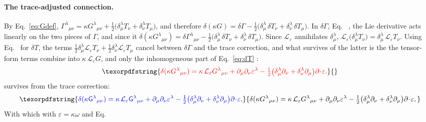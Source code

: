 \documentclass[prd,aps,preprint,superscriptaddress,nofootinbib,amsmath,amssymb,eqsecnum]{revtex4-2}
\providecommand{\DIFaddtex}[1]{{\protect\color{blue} \sf #1}} %
\providecommand{\DIFdeltex}[1]{{\protect\color{red} \scriptsize #1}} %
\providecommand{\DIFaddbegin}{} %
\providecommand{\DIFaddend}{} %
\providecommand{\DIFdelbegin}{} %
\providecommand{\DIFdelend}{} %
\providecommand{\DIFadd}[1]{\texorpdfstring{\DIFaddtex{#1}}{#1}} %
\providecommand{\DIFdel}[1]{\texorpdfstring{\DIFdeltex{#1}}{}} %
\begin{document}
\paragraph{\DIFdel{The trace-adjusted connection.}} %
\addtocounter{paragraph}{-1}%
\DIFdelend By Eq.~\eqref{eq:Gdef},
\DIFdelbegin \DIFdel{$\Gamma^{\lambda}{}_{\mu\nu}=\kappa G^{\lambda}{}_{\mu\nu}
+\tfrac12\big(\delta^\lambda_\mu T_\nu+\delta^\lambda_\nu T_\mu\big)$, and therefore
$\delta(\kappa G)=\delta\Gamma-\tfrac12\big(\delta^\lambda_\mu\,\delta T_\nu+\delta^\lambda_\nu\,\delta T_\mu\big)$. In $\delta\Gamma$, Eq.~}%
\DIFdel{, the Lie derivative acts linearly on the two pieces of
$\Gamma$, and since it }\DIFdelend \DIFaddbegin \DIFadd{$\delta(\kappa G^{\lambda}{}_{\mu\nu})=\delta\Gamma^{\lambda}{}_{\mu\nu}
-\tfrac12\big(\delta^\lambda_\mu\,\delta T_\nu+\delta^\lambda_\nu\,\delta T_\mu\big)$. Since
$\mathcal{L}_\varepsilon$ }\DIFaddend annihilates $\delta^\lambda_\mu$, \DIFdelbegin \DIFdel{$\mathcal{L}_\varepsilon\big(\delta^\lambda_\mu T_\nu\big)=\delta^\lambda_\mu\,\mathcal{L}_\varepsilon T_\nu$.
Using Eq.~}%
\DIFdel{for $\delta T$, the terms $\tfrac12\delta^\lambda_\mu\mathcal{L}_\varepsilon T_\nu
+\tfrac12\delta^\lambda_\nu\mathcal{L}_\varepsilon T_\mu$ cancel between $\delta\Gamma$ and
the trace correction, and what survives of the latter is the }\DIFdelend \DIFaddbegin \DIFadd{the tensor-form terms combine into
$\kappa\,\mathcal{L}_\varepsilon G$, and only the }\DIFaddend inhomogeneous part of Eq.~\eqref{eq:dT}
\DIFdelbegin \DIFdel{:
}\begin{displaymath}
\DIFdel{\delta(\kappa G^{\lambda}{}_{\mu\nu})=\kappa\,\mathcal{L}_\varepsilon G^{\lambda}{}_{\mu\nu}
+\partial_\mu\partial_\nu\varepsilon^\lambda
-\tfrac12\big(\delta^\lambda_\mu\partial_\nu+\delta^\lambda_\nu\partial_\mu\big)\partial\!\cdot\!\varepsilon .
}\end{displaymath}%
\DIFdelend \DIFaddbegin \DIFadd{survives from the trace correction:
}\begin{equation}
\DIFadd{\delta(\kappa G^{\lambda}{}_{\mu\nu})=\kappa\,\mathcal{L}_\varepsilon G^{\lambda}{}_{\mu\nu}
+\partial_\mu\partial_\nu\varepsilon^\lambda
-\tfrac12\big(\delta^\lambda_\mu\partial_\nu+\delta^\lambda_\nu\partial_\mu\big)\partial\!\cdot\!\varepsilon ,
}\end{equation}\DIFaddend 
\DIFdelbegin \DIFdel{With }\DIFdelend \DIFaddbegin \DIFadd{which with }\DIFaddend $\varepsilon=\kappa\omega$ \DIFdelbegin \DIFdel{and Eq.~}%
\end{document}
